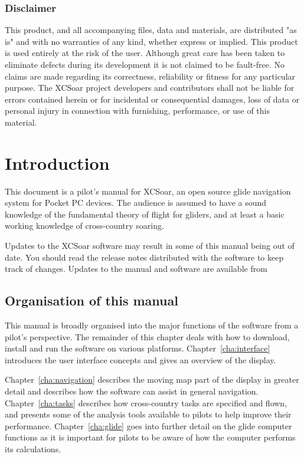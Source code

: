 \documentclass[a4paper,12pt]{refrep}
\begin{document}
\subsection*{Disclaimer}

This product, and all accompanying files, data and materials, are
distributed "as is" and with no warranties of any kind, whether
express or implied.  This product is used entirely at the risk of the
user.  Although great care has been taken to eliminate defects during
its development it is not claimed to be fault-free. No claims are made
regarding its correctness, reliability or fitness for any particular
purpose.  The XCSoar project developers and contributors shall not be
liable for errors contained herein or for incidental or consequential
damages, loss of data or personal injury in connection with
furnishing, performance, or use of this material.


\chapter{Introduction}\label{cha:introduction}
This document is a pilot's manual for XCSoar, an open source glide
navigation system for Pocket PC devices.  The audience is assumed to
have a sound knowledge of the fundamental theory of flight for
gliders, and at least a basic working knowledge of cross-country soaring.

Updates to the XCSoar software may result in some of this manual being
out of date.  You should read the release notes distributed with the
software to keep track of changes.  Updates to the manual and software
are available from 
\begin{quote}
\xcsoarwebsite
\end{quote}

\section{Organisation of this manual}

This manual is broadly organised into the major functions of the
software from a pilot's perspective.  The remainder of this chapter
deals with how to download, install and run the software on various
platforms.  Chapter~\ref{cha:interface} introduces the user interface
concepts and gives an overview of the display.

Chapter~\ref{cha:navigation} describes the moving map part of the
display in greater detail and describes how the software can assist in
general navigation.  Chapter~\ref{cha:tasks} describes how
cross-country tasks are specified and flown, and presents some of the
analysis tools available to pilots to help improve their performance.
Chapter~\ref{cha:glide} goes into further detail on the glide computer
functions as it is important for pilots to be aware of how the
computer performs its calculations.
\end{document}
